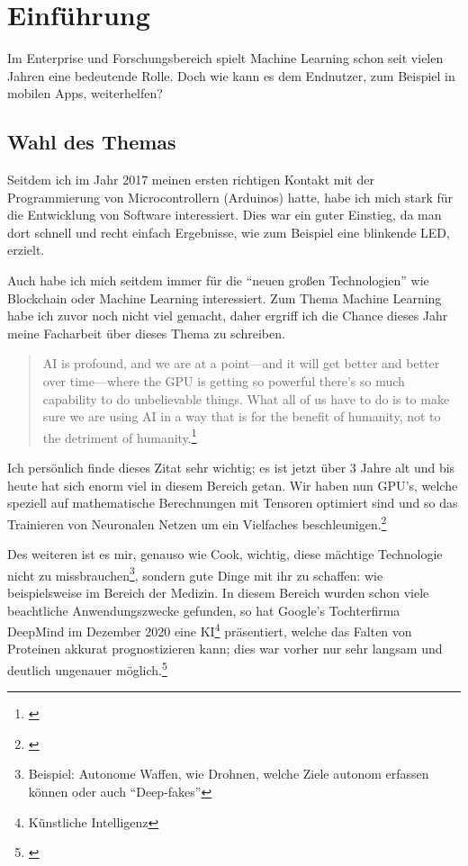 \section{Einführung}
Im Enterprise und Forschungsbereich spielt Machine Learning schon seit vielen Jahren eine bedeutende Rolle. Doch wie kann es dem Endnutzer, zum Beispiel in mobilen Apps, weiterhelfen?

\subsection{Wahl des Themas}

Seitdem ich im Jahr 2017 meinen ersten richtigen Kontakt mit der Programmierung von Microcontrollern (Arduinos) hatte, habe ich mich stark für die Entwicklung von Software interessiert. Dies war ein guter Einstieg, da man dort schnell und recht einfach Ergebnisse, wie zum Beispiel eine blinkende LED, erzielt.

Auch habe ich mich seitdem immer für die "`neuen großen Technologien"' wie Blockchain oder Machine Learning interessiert. Zum Thema Machine Learning habe ich zuvor noch nicht viel gemacht, daher ergriff ich die Chance dieses Jahr meine Facharbeit über dieses Thema zu schreiben.


\begin{quotation}
    AI is profound, and we are at a point—and it will get better and better over time—where the GPU is getting so powerful there’s so much capability to do unbelievable things. What all of us have to do is to make sure we are using AI in a way that is for the benefit of humanity, not to the detriment of humanity.\footnote{\cite[Tim Cook (CEO von Apple) In einem Interview mit MIT Technology Review]{timcookquote}}
\end{quotation}

Ich persönlich finde dieses Zitat sehr wichtig; es ist jetzt über 3 Jahre alt und bis heute hat sich enorm viel in diesem Bereich getan. Wir haben nun GPU's, welche speziell auf mathematische Berechnungen mit Tensoren optimiert sind und so das Trainieren von Neuronalen Netzen um ein Vielfaches beschleunigen.\footnote{\cite[NVIDIA Grafikprozessoren mit integrierten Tensor Kernen]{nvidiatensorcores}}

Des weiteren ist es mir, genauso wie Cook, wichtig, diese mächtige Technologie nicht zu missbrauchen\footnote{Beispiel: Autonome Waffen, wie Drohnen, welche Ziele autonom erfassen können oder auch "`Deep-fakes"'}, sondern gute Dinge mit ihr zu schaffen: wie beispielsweise im Bereich der Medizin. In diesem Bereich wurden schon viele beachtliche Anwendungszwecke gefunden, so hat Google's Tochterfirma DeepMind im Dezember 2020 eine KI\footnote{Künstliche Intelligenz} präsentiert, welche das Falten von Proteinen akkurat prognostizieren kann; dies war vorher nur sehr langsam und deutlich ungenauer möglich.\footnote{\cite{deepmindprotein}}

